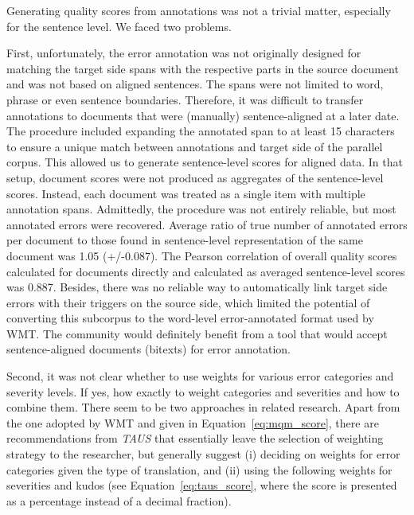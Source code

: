 Generating quality scores from annotations was not a trivial matter, especially for the sentence level. We faced two problems.

First, unfortunately, the error annotation was not originally designed for matching the target side spans with the respective parts in the source document and was not based on aligned sentences. The spans were not limited to word, phrase or even sentence boundaries. Therefore, it was difficult to transfer annotations to documents that were (manually) sentence-aligned at a later date. The procedure included expanding the annotated span to at least 15 characters to ensure a unique match between annotations and target side of the parallel corpus. This allowed us to generate sentence-level scores for aligned data. 
In that setup, document scores were not produced as aggregates of the sentence-level scores. Instead, each document was treated as a single item with multiple annotation spans.  
Admittedly, the procedure was not entirely reliable, but most annotated errors were recovered. Average ratio of true number of annotated errors per document to those found in sentence-level representation of the same document was 1.05 (+/-0.087). The Pearson correlation of overall quality scores calculated for documents directly and calculated as averaged sentence-level scores was 0.887.
Besides, there was no reliable way to automatically link target side errors with their triggers on the source side, which limited the potential of converting this subcorpus to the word-level error-annotated format used by WMT. 
The community would definitely benefit from a tool that would accept sentence-aligned documents (bitexts) for error annotation.  

Second, it was not clear whether to use weights for various error categories and severity levels. If yes, how exactly to weight categories and severities and how to combine them.
There seem to be two approaches in related research. Apart from the one adopted by WMT and given in Equation~\ref{eq:mqm_score}, there are recommendations from \textit{TAUS} that essentially leave the selection of weighting strategy to the researcher, but generally suggest (i) deciding on weights for error categories given the type of translation, and (ii) using the following weights for severities and kudos (see Equation~\ref{eq:taus_score}, where the score is presented as a percentage instead of a decimal fraction).

